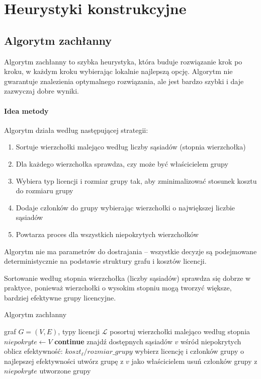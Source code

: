 \section{Heurystyki konstrukcyjne}

\subsection{Algorytm zachłanny}\label{subsec:greedy}

Algorytm zachłanny to szybka heurystyka, która buduje rozwiązanie krok po kroku, w każdym kroku wybierając lokalnie najlepszą opcję. Algorytm nie gwarantuje znalezienia optymalnego rozwiązania, ale jest bardzo szybki i daje zazwyczaj dobre wyniki.

\paragraph{Idea metody}
Algorytm działa według następującej strategii:
\begin{enumerate}
  \item Sortuje wierzchołki malejąco według liczby sąsiadów (stopnia wierzchołka)
  \item Dla każdego wierzchołka sprawdza, czy może być właścicielem grupy
  \item Wybiera typ licencji i rozmiar grupy tak, aby zminimalizować stosunek kosztu do rozmiaru grupy
  \item Dodaje członków do grupy wybierając wierzchołki o największej liczbie sąsiadów
  \item Powtarza proces dla wszystkich niepokrytych wierzchołków
\end{enumerate}

Algorytm nie ma parametrów do dostrajania -- wszystkie decyzje są podejmowane deterministycznie na podstawie struktury grafu i kosztów licencji.

Sortowanie według stopnia wierzchołka (liczby sąsiadów) sprawdza się dobrze w praktyce, ponieważ wierzchołki o wysokim stopniu mogą tworzyć większe, bardziej efektywne grupy licencyjne.

\begin{algorithm}[H]
  \caption{Algorytm zachłanny}
  \label{alg:greedy}
  \begin{algorithmic}[1]
    \Require graf $G=(V,E)$, typy licencji $\mathcal{L}$
    \State posortuj wierzchołki malejąco według stopnia
    \State $niepokryte \gets V$
     \textbf{continue} \EndIf
    \State znajdź dostępnych sąsiadów $v$ wśród niepokrytych
    \State oblicz efektywność: $koszt_\ell / rozmiar\_grupy$
    \EndFor
    \State wybierz licencję i członków grupy o najlepszej efektywności
    \State utwórz grupę z $v$ jako właścicielem
    \State usuń członków grupy z $niepokryte$
    \EndFor
    \State \Return utworzone grupy
  \end{algorithmic}
\end{algorithm}


